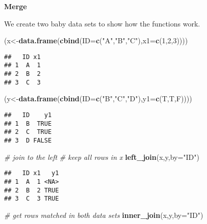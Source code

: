 \documentclass[
]{article}
\newenvironment{Shaded}{\begin{snugshade}}{\end{snugshade}}
\newcommand{\CommentTok}[1]{\textcolor[rgb]{0.56,0.35,0.01}{\textit{#1}}}
\newcommand{\DataTypeTok}[1]{\textcolor[rgb]{0.13,0.29,0.53}{#1}}
\newcommand{\DecValTok}[1]{\textcolor[rgb]{0.00,0.00,0.81}{#1}}
\newcommand{\KeywordTok}[1]{\textcolor[rgb]{0.13,0.29,0.53}{\textbf{#1}}}
\newcommand{\NormalTok}[1]{#1}
\newcommand{\StringTok}[1]{\textcolor[rgb]{0.31,0.60,0.02}{#1}}
\begin{document}
\textbf{Merge}

We create two baby data sets to show how the functions work.

\begin{Shaded}
\begin{Highlighting}[]
\NormalTok{(x<-}\KeywordTok{data.frame}\NormalTok{(}\KeywordTok{cbind}\NormalTok{(}\DataTypeTok{ID=}\KeywordTok{c}\NormalTok{(}\StringTok{"A"}\NormalTok{,}\StringTok{"B"}\NormalTok{,}\StringTok{"C"}\NormalTok{),}\DataTypeTok{x1=}\KeywordTok{c}\NormalTok{(}\DecValTok{1}\NormalTok{,}\DecValTok{2}\NormalTok{,}\DecValTok{3}\NormalTok{))))}
\end{Highlighting}
\end{Shaded}

\begin{verbatim}
##   ID x1
## 1  A  1
## 2  B  2
## 3  C  3
\end{verbatim}

\begin{Shaded}
\begin{Highlighting}[]
\NormalTok{(y<-}\KeywordTok{data.frame}\NormalTok{(}\KeywordTok{cbind}\NormalTok{(}\DataTypeTok{ID=}\KeywordTok{c}\NormalTok{(}\StringTok{"B"}\NormalTok{,}\StringTok{"C"}\NormalTok{,}\StringTok{"D"}\NormalTok{),}\DataTypeTok{y1=}\KeywordTok{c}\NormalTok{(T,T,F))))}
\end{Highlighting}
\end{Shaded}

\begin{verbatim}
##   ID    y1
## 1  B  TRUE
## 2  C  TRUE
## 3  D FALSE
\end{verbatim}

\begin{Shaded}
\begin{Highlighting}[]
\CommentTok{# join to the left}
\CommentTok{# keep all rows in x}
\KeywordTok{left_join}\NormalTok{(x,y,}\DataTypeTok{by=}\StringTok{"ID"}\NormalTok{)}
\end{Highlighting}
\end{Shaded}

\begin{verbatim}
##   ID x1   y1
## 1  A  1 <NA>
## 2  B  2 TRUE
## 3  C  3 TRUE
\end{verbatim}

\begin{Shaded}
\begin{Highlighting}[]
\CommentTok{# get rows matched in both data sets}
\KeywordTok{inner_join}\NormalTok{(x,y,}\DataTypeTok{by=}\StringTok{"ID"}\NormalTok{)}
\end{Highlighting}
\end{Shaded}
\end{document}
